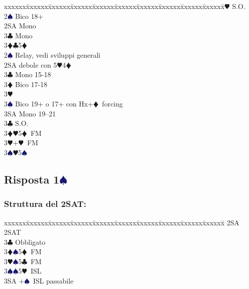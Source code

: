 \documentclass[a4paper,italian]{article}
\newcommand{\BC}{\textcolor{OliveGreen}{$\clubsuit$}}
\newcommand{\BD}{\textcolor{RedOrange}{$\vardiamondsuit$}}
\newcommand{\BH}{\textcolor{Red2}{$\varheartsuit${}}}
\newcommand{\BS}{\textcolor{MidnightBlue}{$\spadesuit${}}}
\newcommand{\pdfs}{\texorpdfstring{\BS{}}{S}}
\newenvironment{bidtable}
{\begin{tabbing}

    xxxxxx\=xxxxxx\=xxxxxx\=xxxxxx\=xxxxxx\=xxxxxx\=xxxxxx\=xxxxxx\=xxxxxx\=xxxxxx\=\kill}
{\end{tabbing} }%
\begin{document}
\begin{multicols}{2}
\begin{bidtable}
                                        2\BH \> S.O.\+\\
                                        2\BS \> Bico 18+\\
                                        2SA\> Mono\\
                                        3\BC \> Mono\\
                                        3\BD {}\BC 5\BD \-\\
                                        2\BS \> Relay, vedi sviluppi generali\\
                                        2SA \> debole con 5\BH 4\BD \+\\
                                        3\BC \> Mono 15-18\\
                                        3\BD \> Bico 17-18\\
                                        3\BH {}\\
                                        3\BS \> Bico 19+ o 17+ con Hx+\BD\ forcing\\
                                        3SA \> Mono 19--21\-\\
                                        3\BC \> S.O.\\
                                        3\BD {}\BH 5\BD\ FM\\
                                        3\BH {}+\BH\ FM\\
                                        3\BS {}\BH 5\BS \-
                                    \end{bidtable}
                                    \subsection{Risposta 1\pdfs}
                                    \subsubsection{Struttura del 2SAT:}

                                    \begin{bidtable}
                                        2SA \> 2SAT\+\\
                                        3\BC \> Obbligato\+\\
                                        3\BD {}\BS 5\BD\ FM\\
                                        3\BH {}\BS 5\BC\ FM\\
                                        3\BS {}\BS 5\BH\ ISL\\
                                        3SA +\BS\ ISL passabile\-\-
                                    \end{bidtable}

\end{multicols}
\end{document}
